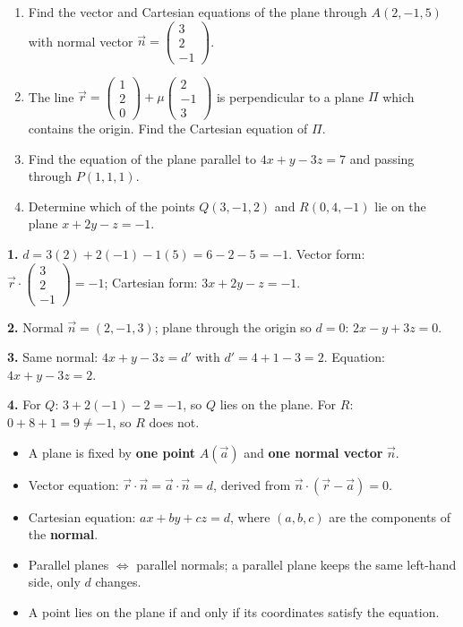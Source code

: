 \documentclass[11pt]{article}
\begin{document}
\begin{exercice}[Practice]
\begin{enumerate}
\item Find the vector and Cartesian equations of the plane through $A(2,-1,5)$ with normal vector $\vec{n} = \begin{pmatrix}3\\2\\-1\end{pmatrix}$.
\item The line $\vec{r} = \begin{pmatrix}1\\2\\0\end{pmatrix} + \mu\begin{pmatrix}2\\-1\\3\end{pmatrix}$ is perpendicular to a plane $\Pi$ which contains the origin. Find the Cartesian equation of $\Pi$.
\item Find the equation of the plane parallel to $4x + y - 3z = 7$ and passing through $P(1,1,1)$.
\item Determine which of the points $Q(3,-1,2)$ and $R(0,4,-1)$ lie on the plane $x + 2y - z = -1$.
\end{enumerate}
\end{exercice}

\begin{corrige}[Exercise 1]
\textbf{1.} $d = 3(2)+2(-1)-1(5) = 6-2-5 = -1$. Vector form: $\vec{r}\cdot\begin{pmatrix}3\\2\\-1\end{pmatrix} = -1$; Cartesian form: $3x+2y-z=-1$.\par
\textbf{2.} Normal $\vec{n} = (2,-1,3)$; plane through the origin so $d=0$: $2x - y + 3z = 0$.\par
\textbf{3.} Same normal: $4x+y-3z = d'$ with $d' = 4+1-3 = 2$. Equation: $4x+y-3z=2$.\par
\textbf{4.} For $Q$: $3 + 2(-1) - 2 = -1$, so $Q$ lies on the plane. For $R$: $0 + 8 + 1 = 9 \neq -1$, so $R$ does not.
\end{corrige}

\begin{aretenir}
\begin{itemize}
\item A plane is fixed by \textbf{one point} $A(\vec{a})$ and \textbf{one normal vector} $\vec{n}$.
\item Vector equation: $\vec{r}\cdot\vec{n} = \vec{a}\cdot\vec{n} = d$, derived from $\vec{n}\cdot(\vec{r}-\vec{a})=0$.
\item Cartesian equation: $ax+by+cz=d$, where $(a,b,c)$ are the components of the \textbf{normal}.
\item Parallel planes $\iff$ parallel normals; a parallel plane keeps the same left-hand side, only $d$ changes.
\item A point lies on the plane if and only if its coordinates satisfy the equation.
\end{itemize}
\end{aretenir}
\end{document}
